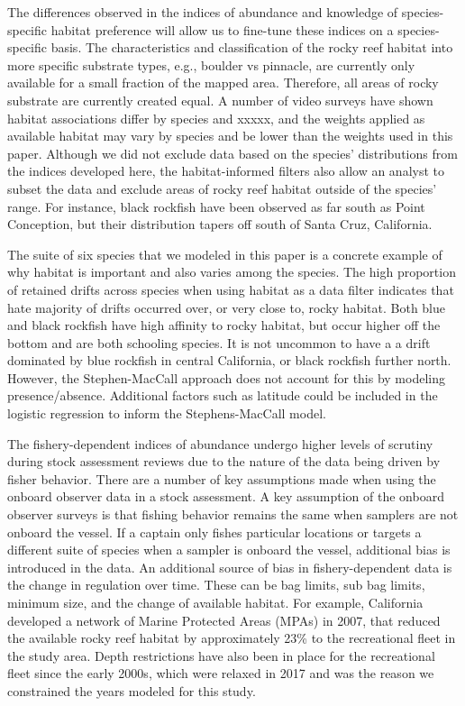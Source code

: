 \documentclass[
  12pt,
  authoryear,
  preprint,
  3p]{elsarticle}
\begin{document}
The differences observed in the indices of abundance and knowledge of
species-specific habitat preference will allow us to fine-tune these
indices on a species-specific basis. The characteristics and
classification of the rocky reef habitat into more specific substrate
types, e.g., boulder vs pinnacle, are currently only available for a
small fraction of the mapped area. Therefore, all areas of rocky
substrate are currently created equal. A number of video surveys have
shown habitat associations differ by species and xxxxx, and the weights
applied as available habitat may vary by species and be lower than the
weights used in this paper. Although we did not exclude data based on
the species' distributions from the indices developed here, the
habitat-informed filters also allow an analyst to subset the data and
exclude areas of rocky reef habitat outside of the species' range. For
instance, black rockfish have been observed as far south as Point
Conception, but their distribution tapers off south of Santa Cruz,
California.

The suite of six species that we modeled in this paper is a concrete
example of why habitat is important and also varies among the species.
The high proportion of retained drifts across species when using habitat
as a data filter indicates that hate majority of drifts occurred over,
or very close to, rocky habitat. Both blue and black rockfish have high
affinity to rocky habitat, but occur higher off the bottom and are both
schooling species. It is not uncommon to have a a drift dominated by
blue rockfish in central California, or black rockfish further north.
However, the Stephen-MacCall approach does not account for this by
modeling presence/absence. Additional factors such as latitude could be
included in the logistic regression to inform the Stephens-MacCall
model.

The fishery-dependent indices of abundance undergo higher levels of
scrutiny during stock assessment reviews due to the nature of the data
being driven by fisher behavior. There are a number of key assumptions
made when using the onboard observer data in a stock assessment. A key
assumption of the onboard observer surveys is that fishing behavior
remains the same when samplers are not onboard the vessel. If a captain
only fishes particular locations or targets a different suite of species
when a sampler is onboard the vessel, additional bias is introduced in
the data. An additional source of bias in fishery-dependent data is the
change in regulation over time. These can be bag limits, sub bag limits,
minimum size, and the change of available habitat. For example,
California developed a network of Marine Protected Areas (MPAs) in 2007,
that reduced the available rocky reef habitat by approximately 23\% to
the recreational fleet in the study area. Depth restrictions have also
been in place for the recreational fleet since the early 2000s, which
were relaxed in 2017 and was the reason we constrained the years modeled
for this study.
\end{document}
